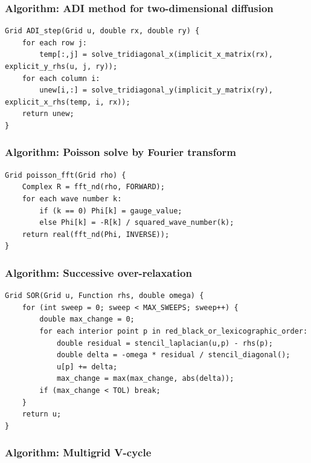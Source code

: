 \documentclass[11pt]{article}
\begin{document}
\subsubsection{Algorithm: ADI method for two-dimensional diffusion}\label{algorithm-adi-method-for-two-dimensional-diffusion}

\begin{verbatim}
Grid ADI_step(Grid u, double rx, double ry) {
    for each row j:
        temp[:,j] = solve_tridiagonal_x(implicit_x_matrix(rx), explicit_y_rhs(u, j, ry));
    for each column i:
        unew[i,:] = solve_tridiagonal_y(implicit_y_matrix(ry), explicit_x_rhs(temp, i, rx));
    return unew;
}
\end{verbatim}

\subsubsection{Algorithm: Poisson solve by Fourier transform}\label{algorithm-poisson-solve-by-fourier-transform}

\begin{verbatim}
Grid poisson_fft(Grid rho) {
    Complex R = fft_nd(rho, FORWARD);
    for each wave number k:
        if (k == 0) Phi[k] = gauge_value;
        else Phi[k] = -R[k] / squared_wave_number(k);
    return real(fft_nd(Phi, INVERSE));
}
\end{verbatim}

\subsubsection{Algorithm: Successive over-relaxation}\label{algorithm-successive-over-relaxation}

\begin{verbatim}
Grid SOR(Grid u, Function rhs, double omega) {
    for (int sweep = 0; sweep < MAX_SWEEPS; sweep++) {
        double max_change = 0;
        for each interior point p in red_black_or_lexicographic_order:
            double residual = stencil_laplacian(u,p) - rhs(p);
            double delta = -omega * residual / stencil_diagonal();
            u[p] += delta;
            max_change = max(max_change, abs(delta));
        if (max_change < TOL) break;
    }
    return u;
}
\end{verbatim}

\subsubsection{Algorithm: Multigrid V-cycle}\label{algorithm-multigrid-v-cycle}
\end{document}
